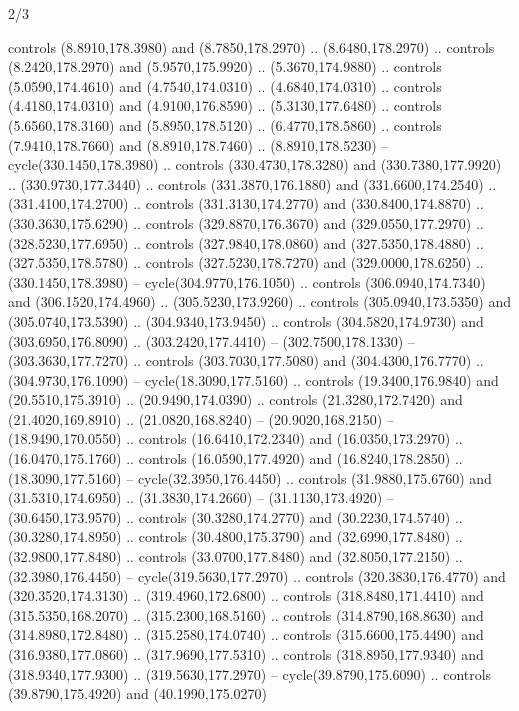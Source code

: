 \begin{flagdescription}{2/3}
\begin{scope}[xshift=0.5\flaglength,yshift=0.5\flagwidth,scale=\stretchfactor]
\begin{scope}[scale=0.001645\flagwidth,yshift=65mm,xshift=-63mm]
\begin{scope}[y=0.80pt, x=0.80pt, yscale=-1,]
\begin{scope}[cm={{1.33333,0.0,0.0,1.33333,(0.0,1e-05)}}]
  controls (8.8910,178.3980) and (8.7850,178.2970) .. (8.6480,178.2970) ..
  controls (8.2420,178.2970) and (5.9570,175.9920) .. (5.3670,174.9880) ..
  controls (5.0590,174.4610) and (4.7540,174.0310) .. (4.6840,174.0310) ..
  controls (4.4180,174.0310) and (4.9100,176.8590) .. (5.3130,177.6480) ..
  controls (5.6560,178.3160) and (5.8950,178.5120) .. (6.4770,178.5860) ..
  controls (7.9410,178.7660) and (8.8910,178.7460) .. (8.8910,178.5230) --
  cycle(330.1450,178.3980) .. controls (330.4730,178.3280) and
  (330.7380,177.9920) .. (330.9730,177.3440) .. controls (331.3870,176.1880) and
  (331.6600,174.2540) .. (331.4100,174.2700) .. controls (331.3130,174.2770) and
  (330.8400,174.8870) .. (330.3630,175.6290) .. controls (329.8870,176.3670) and
  (329.0550,177.2970) .. (328.5230,177.6950) .. controls (327.9840,178.0860) and
  (327.5350,178.4880) .. (327.5350,178.5780) .. controls (327.5230,178.7270) and
  (329.0000,178.6250) .. (330.1450,178.3980) -- cycle(304.9770,176.1050) ..
  controls (306.0940,174.7340) and (306.1520,174.4960) .. (305.5230,173.9260) ..
  controls (305.0940,173.5350) and (305.0740,173.5390) .. (304.9340,173.9450) ..
  controls (304.5820,174.9730) and (303.6950,176.8090) .. (303.2420,177.4410) --
  (302.7500,178.1330) -- (303.3630,177.7270) .. controls (303.7030,177.5080) and
  (304.4300,176.7770) .. (304.9730,176.1090) -- cycle(18.3090,177.5160) ..
  controls (19.3400,176.9840) and (20.5510,175.3910) .. (20.9490,174.0390) ..
  controls (21.3280,172.7420) and (21.4020,169.8910) .. (21.0820,168.8240) --
  (20.9020,168.2150) -- (18.9490,170.0550) .. controls (16.6410,172.2340) and
  (16.0350,173.2970) .. (16.0470,175.1760) .. controls (16.0590,177.4920) and
  (16.8240,178.2850) .. (18.3090,177.5160) -- cycle(32.3950,176.4450) ..
  controls (31.9880,175.6760) and (31.5310,174.6950) .. (31.3830,174.2660) --
  (31.1130,173.4920) -- (30.6450,173.9570) .. controls (30.3280,174.2770) and
  (30.2230,174.5740) .. (30.3280,174.8950) .. controls (30.4800,175.3790) and
  (32.6990,177.8480) .. (32.9800,177.8480) .. controls (33.0700,177.8480) and
  (32.8050,177.2150) .. (32.3980,176.4450) -- cycle(319.5630,177.2970) ..
  controls (320.3830,176.4770) and (320.3520,174.3130) .. (319.4960,172.6800) ..
  controls (318.8480,171.4410) and (315.5350,168.2070) .. (315.2300,168.5160) ..
  controls (314.8790,168.8630) and (314.8980,172.8480) .. (315.2580,174.0740) ..
  controls (315.6600,175.4490) and (316.9380,177.0860) .. (317.9690,177.5310) ..
  controls (318.8950,177.9340) and (318.9340,177.9300) .. (319.5630,177.2970) --
  cycle(39.8790,175.6090) .. controls (39.8790,175.4920) and (40.1990,175.0270)

\end{scope}
\end{scope}
\end{scope}
\end{scope}
\end{flagdescription}
